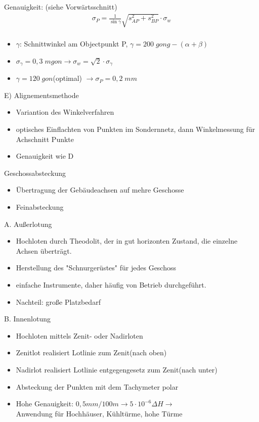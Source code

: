 \documentclass[12pt]{article}
\begin{document}
Genauigkeit: (siehe Vorwärtsschnitt)
\begin{gather*}
\sigma_P = \frac{1}{\sin \gamma} \sqrt{s_{AP}^2 + s_{BP}^2} \cdot \sigma_w \\
\end{gather*}
\begin{itemize}
\item $\gamma$: Schnittwinkel am Objectpunkt P, $\gamma = 200\; gong - (\alpha + \beta)$
\item $\sigma_{\gamma} = 0,3\; mgon \longrightarrow \sigma_w = \sqrt{2} \cdot \sigma_{\gamma}$
\item $\gamma = 120\; gon$(optimal) $\longrightarrow \sigma_P = 0,2\; mm$
\end{itemize}
E) Alignementsmethode
\begin{itemize}
\item Variantion des Winkelverfahren
\item optisches Einflachten von Punkten im Sondernnetz, dann Winkelmessung für Achschnitt Punkte
\item Genauigkeit wie D
\end{itemize}
Geschossabsteckung 
\begin{itemize}
\item Übertragung der Gebäudeachsen auf mehre Geschosse 
\item Feinabsteckung
\end{itemize}
A. Außerlotung
\begin{itemize}
\item Hochloten durch Theodolit, der in gut horizonten Zustand, die einzelne Achsen überträgt.
\item Herstellung des "Schnurgerüstes" für jedes Geschoss
\item einfache Instrumente, daher häufig von Betrieb durchgeführt.
\item Nachteil: große Platzbedarf
\end{itemize}
B. Innenlotung 
\begin{itemize}
\item Hochloten mittels Zenit- oder Nadirloten
\item Zenitlot realisiert Lotlinie zum Zenit(nach oben)
\item Nadirlot realisiert Lotlinie entgegengesetz zum Zenit(nach unter)
\item Absteckung der Punkten mit dem Tachymeter polar
\item Hohe Genauigkeit: $0,5mm / 100m \longrightarrow 5 \cdot 10^{-6} \Delta H \rightarrow$ \\ 
Anwendung für Hochhäuser, Kühltürme, hohe Türme
\end{itemize}
\end{document}

